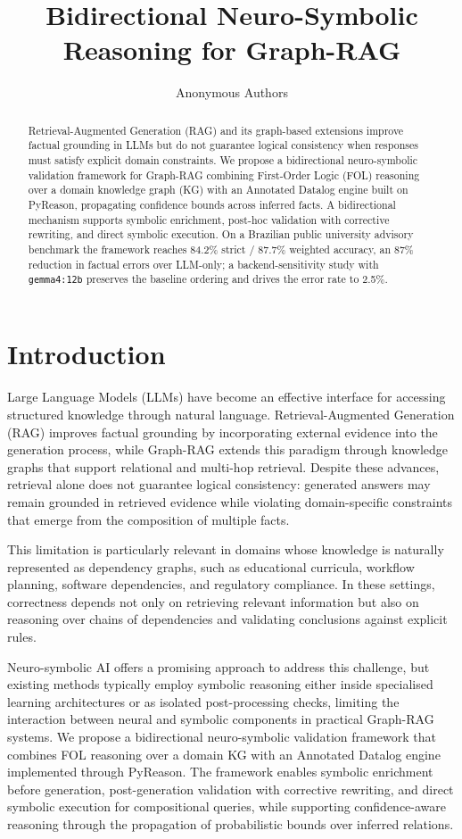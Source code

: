\documentclass[12pt]{article}
\title{Bidirectional Neuro-Symbolic Reasoning for Graph-RAG}
\author{Anonymous Authors\inst{1}}
\begin{document}
\maketitle

\begin{abstract}
Retrieval-Augmented Generation (RAG) and its graph-based extensions improve factual grounding in LLMs but do not guarantee logical consistency when responses must satisfy explicit domain constraints. We propose a bidirectional neuro-symbolic validation framework for Graph-RAG combining First-Order Logic (FOL) reasoning over a domain knowledge graph (KG) with an Annotated Datalog engine built on PyReason, propagating confidence bounds across inferred facts. A bidirectional mechanism supports symbolic enrichment, post-hoc validation with corrective rewriting, and direct symbolic execution. On a Brazilian public university advisory benchmark the framework reaches 84.2\% strict / 87.7\% weighted accuracy, an 87\% reduction in factual errors over LLM-only; a backend-sensitivity study with \texttt{gemma4:12b} preserves the baseline ordering and drives the error rate to 2.5\%.
\end{abstract}

\section{Introduction}

Large Language Models (LLMs) have become an effective interface for accessing structured knowledge through natural language. Retrieval-Augmented Generation (RAG) improves factual grounding by incorporating external evidence into the generation process, while Graph-RAG extends this paradigm through knowledge graphs that support relational and multi-hop retrieval. Despite these advances, retrieval alone does not guarantee logical consistency: generated answers may remain grounded in retrieved evidence while violating domain-specific constraints that emerge from the composition of multiple facts.

This limitation is particularly relevant in domains whose knowledge is naturally represented as dependency graphs, such as educational curricula, workflow planning, software dependencies, and regulatory compliance. In these settings, correctness depends not only on retrieving relevant information but also on reasoning over chains of dependencies and validating conclusions against explicit rules.

Neuro-symbolic AI offers a promising approach to address this challenge, but existing methods typically employ symbolic reasoning either inside specialised learning architectures or as isolated post-processing checks, limiting the interaction between neural and symbolic components in practical Graph-RAG systems. We propose a bidirectional neuro-symbolic validation framework that combines FOL reasoning over a domain KG with an Annotated Datalog engine implemented through PyReason. The framework enables symbolic enrichment before generation, post-generation validation with corrective rewriting, and direct symbolic execution for compositional queries, while supporting confidence-aware reasoning through the propagation of probabilistic bounds over inferred relations.
\end{document}
